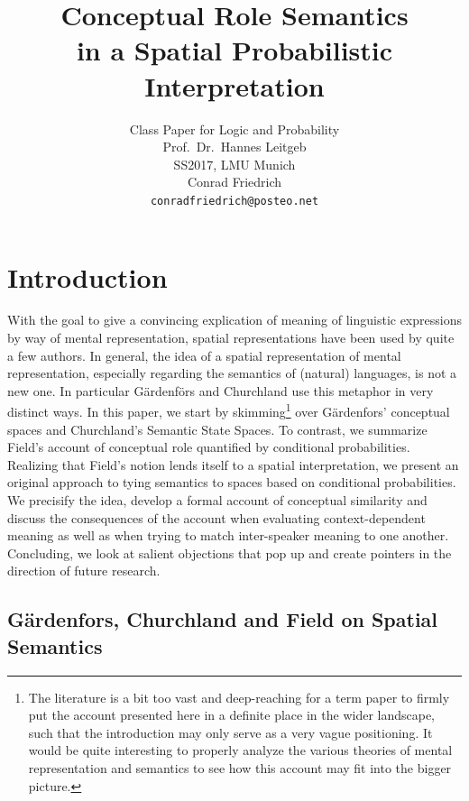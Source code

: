 \documentclass[11pt, a4paper]{scrartcl}
\title{\osfamily{}Conceptual Role Semantics \\ in a Spatial Probabilistic Interpretation}
\author{Class Paper for Logic and Probability \\ Prof.\ Dr.\ Hannes Leitgeb \\ SS2017, LMU Munich \\ Conrad Friedrich \\ \texttt{conradfriedrich@posteo.net}}
\begin{document}
\maketitle
\thispagestyle{empty}
\tableofcontents

\section{Introduction}

With the goal to give a convincing explication of meaning of linguistic expressions by way of mental representation, spatial representations have been used by quite a few authors. In general, the idea of a spatial representation of mental representation, especially regarding the semantics of (natural) languages, is not a new one. In particular Gärdenförs and Churchland use this metaphor in very distinct ways. In this paper, we start by skimming\footnote{The literature is a bit too vast and deep-reaching for a term paper to firmly put the account presented here in a definite place in the wider landscape, such that the introduction may only serve as a very vague positioning. It would be quite interesting to properly analyze the various theories of mental representation and semantics to see how this account may fit into the bigger picture.} over Gärdenfors' conceptual spaces and Churchland's Semantic State Spaces. To contrast, we summarize Field's account of conceptual role quantified by conditional probabilities. Realizing that Field's notion lends itself to a spatial interpretation, we present an original approach to tying semantics to spaces based on conditional probabilities. We precisify the idea, develop a formal account of conceptual similarity and discuss the consequences of the account when evaluating context-dependent meaning as well as when trying to match inter-speaker meaning to one another. Concluding, we look at salient objections that pop up and create pointers in the direction of future research.  

\subsection{Gärdenfors, Churchland and Field on Spatial Semantics}
\end{document}
